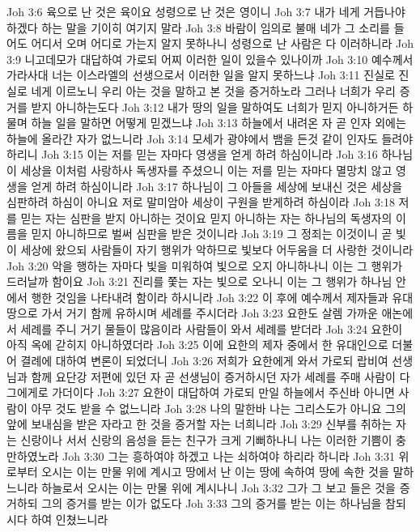 Joh 3:6  육으로 난 것은 육이요 성령으로 난 것은 영이니
Joh 3:7  내가 네게 거듭나야 하겠다 하는 말을 기이히 여기지 말라
Joh 3:8  바람이 임의로 불매 네가 그 소리를 들어도 어디서 오며 어디로 가는지 알지 못하나니 성령으로 난 사람은 다 이러하니라
Joh 3:9  니고데모가 대답하여 가로되 어찌 이러한 일이 있을수 있나이까
Joh 3:10  예수께서 가라사대 너는 이스라엘의 선생으로서 이러한 일을 알지 못하느냐
Joh 3:11  진실로 진실로 네게 이르노니 우리 아는 것을 말하고 본 것을 증거하노라 그러나 너희가 우리 증거를 받지 아니하는도다
Joh 3:12  내가 땅의 일을 말하여도 너희가 믿지 아니하거든 하물며 하늘 일을 말하면 어떻게 믿겠느냐
Joh 3:13  하늘에서 내려온 자 곧 인자 외에는 하늘에 올라간 자가 없느니라
Joh 3:14  모세가 광야에서 뱀을 든것 같이 인자도 들려야 하리니
Joh 3:15  이는 저를 믿는 자마다 영생을 얻게 하려 하심이니라
Joh 3:16  하나님이 세상을 이처럼 사랑하사 독생자를 주셨으니 이는 저를 믿는 자마다 멸망치 않고 영생을 얻게 하려 하심이니라
Joh 3:17  하나님이 그 아들을 세상에 보내신 것은 세상을 심판하려 하심이 아니요 저로 말미암아 세상이 구원을 받게하려 하심이라
Joh 3:18  저를 믿는 자는 심판을 받지 아니하는 것이요 믿지 아니하는 자는 하나님의 독생자의 이름을 믿지 아니하므로 벌써 심판을 받은 것이니라
Joh 3:19  그 정죄는 이것이니 곧 빛이 세상에 왔으되 사람들이 자기 행위가 악하므로 빛보다 어두움을 더 사랑한 것이니라
Joh 3:20  악을 행하는 자마다 빛을 미워하여 빛으로 오지 아니하나니 이는 그 행위가 드러날까 함이요
Joh 3:21  진리를 쫓는 자는 빛으로 오나니 이는 그 행위가 하나님 안에서 행한 것임을 나타내려 함이라 하시니라
Joh 3:22  이 후에 예수께서 제자들과 유대 땅으로 가서 거기 함께 유하시며 세례를 주시더라
Joh 3:23  요한도 살렘 가까운 애논에서 세례를 주니 거기 물들이 많음이라 사람들이 와서 세례를 받더라
Joh 3:24  요한이 아직 옥에 갇히지 아니하였더라
Joh 3:25  이에 요한의 제자 중에서 한 유대인으로 더불어 결례에 대하여 변론이 되었더니
Joh 3:26  저희가 요한에게 와서 가로되 랍비여 선생님과 함께 요단강 저편에 있던 자 곧 선생님이 증거하시던 자가 세례를 주매 사람이 다 그에게로 가더이다
Joh 3:27  요한이 대답하여 가로되 만일 하늘에서 주신바 아니면 사람이 아무 것도 받을 수 없느니라
Joh 3:28  나의 말한바 나는 그리스도가 아니요 그의 앞에 보내심을 받은 자라고 한 것을 증거할 자는 너희니라
Joh 3:29  신부를 취하는 자는 신랑이나 서서 신랑의 음성을 듣는 친구가 크게 기뻐하나니 나는 이러한 기쁨이 충만하였노라
Joh 3:30  그는 흥하여야 하겠고 나는 쇠하여야 하리라 하니라
Joh 3:31  위로부터 오시는 이는 만물 위에 계시고 땅에서 난 이는 땅에 속하여 땅에 속한 것을 말하느니라 하늘로서 오시는 이는 만물 위에 계시나니
Joh 3:32  그가 그 보고 들은 것을 증거하되 그의 증거를 받는 이가 없도다
Joh 3:33  그의 증거를 받는 이는 하나님을 참되시다 하여 인쳤느니라
